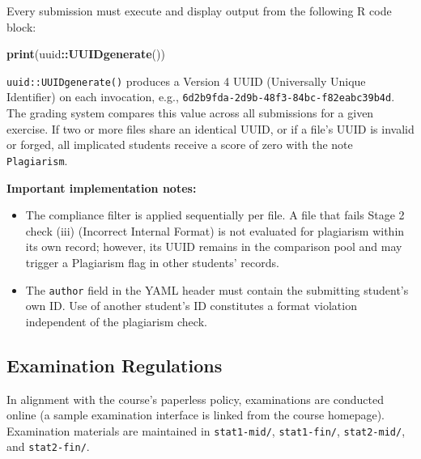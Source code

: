 \documentclass[
]{article}
\newenvironment{Shaded}{\begin{snugshade}}{\end{snugshade}}
\newcommand{\FunctionTok}[1]{\textcolor[rgb]{0.13,0.29,0.53}{\textbf{#1}}}
\newcommand{\NormalTok}[1]{#1}
\newcommand{\SpecialCharTok}[1]{\textcolor[rgb]{0.81,0.36,0.00}{\textbf{#1}}}
\providecommand{\tightlist}{%
  \setlength{\itemsep}{0pt}\setlength{\parskip}{0pt}}
\begin{document}
Every submission must execute and display output from the following R
code block:

\begin{Shaded}
\begin{Highlighting}[]
\FunctionTok{print}\NormalTok{(uuid}\SpecialCharTok{::}\FunctionTok{UUIDgenerate}\NormalTok{())}
\end{Highlighting}
\end{Shaded}

\texttt{uuid::UUIDgenerate()} produces a Version 4 UUID (Universally
Unique Identifier) on each invocation, e.g.,
\texttt{6d2b9fda-2d9b-48f3-84bc-f82eabc39b4d}. The grading system
compares this value across all submissions for a given exercise. If two
or more files share an identical UUID, or if a file's UUID is invalid or
forged, all implicated students receive a score of zero with the note
\texttt{Plagiarism}.

\textbf{Important implementation notes:}

\begin{itemize}
\tightlist
\item
  The compliance filter is applied sequentially per file. A file that
  fails Stage 2 check (iii) (Incorrect Internal Format) is not evaluated
  for plagiarism within its own record; however, its UUID remains in the
  comparison pool and may trigger a Plagiarism flag in other students'
  records.
\item
  The \texttt{author} field in the YAML header must contain the
  submitting student's own ID. Use of another student's ID constitutes a
  format violation independent of the plagiarism check.
\end{itemize}

\subsection{Examination Regulations}\label{examination-regulations}

In alignment with the course's paperless policy, examinations are
conducted online (a sample examination interface is linked from the
course homepage). Examination materials are maintained in
\texttt{stat1-mid/}, \texttt{stat1-fin/}, \texttt{stat2-mid/}, and
\texttt{stat2-fin/}.
\end{document}
